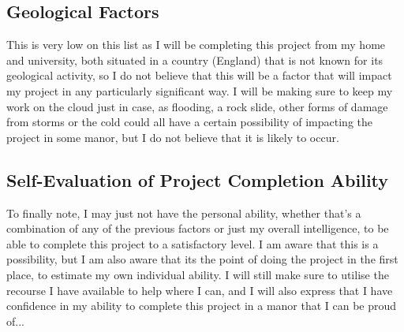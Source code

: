 \documentclass{article}
\begin{document}
\subsection{Geological Factors}
This is very low on this list as I will be completing this project from my home and university, both situated in a country (England) that is not known for its geological activity, so I do not believe that this will be a factor that will impact my project in any particularly significant way. I will be making sure to keep my work on the cloud just in case, as flooding, a rock slide, other forms of damage from storms or the cold could all have a certain possibility of impacting the project in some manor, but I do not believe that it is likely to occur.

\subsection{Self-Evaluation of Project Completion Ability}
To finally note, I may just not have the personal ability, whether that's a combination of any of the previous factors or just my overall intelligence, to be able to complete this project to a satisfactory level. I am aware that this is a possibility, but I am also aware that its the point of doing the project in the first place, to estimate my own individual ability. I will still make sure to utilise the recourse I have available to help where I can, and I will also express that I have confidence in my ability to complete this project in a manor that I can be proud of...
\end{document}
